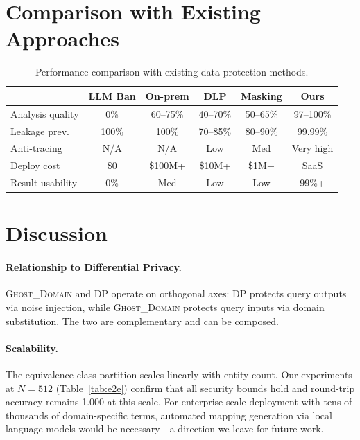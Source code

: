 \documentclass[11pt]{article}
\begin{document}
\section{Comparison with Existing Approaches}

\begin{table}[t]
\centering
\caption{Performance comparison with existing data protection methods.}
\label{tab:comparison}
\begin{tabular}{@{}lccccc@{}}
\toprule
 & LLM Ban & On-prem & DLP & Masking & Ours \\
\midrule
Analysis quality   & 0\%    & 60--75\% & 40--70\% & 50--65\% & 97--100\% \\
Leakage prev.      & 100\%  & 100\%    & 70--85\% & 80--90\% & 99.99\% \\
Anti-tracing       & N/A    & N/A      & Low      & Med      & Very high \\
Deploy cost        & \$0    & \$100M+  & \$10M+   & \$1M+    & SaaS \\
Result usability   & 0\%    & Med      & Low      & Low      & 99\%+ \\
\bottomrule
\end{tabular}
\end{table}

\section{Discussion}

\paragraph{Relationship to Differential Privacy.} \textsc{Ghost\_Domain} and DP operate on orthogonal axes: DP protects query outputs via noise injection, while \textsc{Ghost\_Domain} protects query inputs via domain substitution. The two are complementary and can be composed.

\paragraph{Scalability.} The equivalence class partition scales linearly with entity count. Our experiments at $N=512$ (Table~\ref{tab:e2e}) confirm that all security bounds hold and round-trip accuracy remains 1.000 at this scale. For enterprise-scale deployment with tens of thousands of domain-specific terms, automated mapping generation via local language models would be necessary---a direction we leave for future work.
\end{document}
